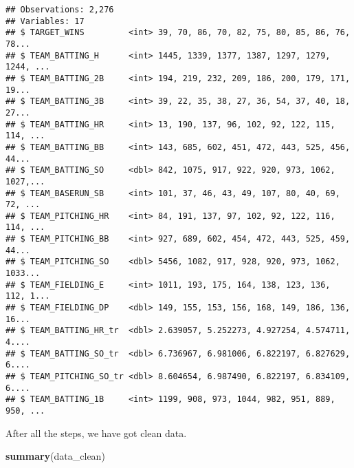 \documentclass[]{article}
\newenvironment{Shaded}{\begin{snugshade}}{\end{snugshade}}
\newcommand{\KeywordTok}[1]{\textcolor[rgb]{0.13,0.29,0.53}{\textbf{#1}}}
\newcommand{\NormalTok}[1]{#1}
\begin{document}
\begin{verbatim}
## Observations: 2,276
## Variables: 17
## $ TARGET_WINS         <int> 39, 70, 86, 70, 82, 75, 80, 85, 86, 76, 78...
## $ TEAM_BATTING_H      <int> 1445, 1339, 1377, 1387, 1297, 1279, 1244, ...
## $ TEAM_BATTING_2B     <int> 194, 219, 232, 209, 186, 200, 179, 171, 19...
## $ TEAM_BATTING_3B     <int> 39, 22, 35, 38, 27, 36, 54, 37, 40, 18, 27...
## $ TEAM_BATTING_HR     <int> 13, 190, 137, 96, 102, 92, 122, 115, 114, ...
## $ TEAM_BATTING_BB     <int> 143, 685, 602, 451, 472, 443, 525, 456, 44...
## $ TEAM_BATTING_SO     <dbl> 842, 1075, 917, 922, 920, 973, 1062, 1027,...
## $ TEAM_BASERUN_SB     <int> 101, 37, 46, 43, 49, 107, 80, 40, 69, 72, ...
## $ TEAM_PITCHING_HR    <int> 84, 191, 137, 97, 102, 92, 122, 116, 114, ...
## $ TEAM_PITCHING_BB    <int> 927, 689, 602, 454, 472, 443, 525, 459, 44...
## $ TEAM_PITCHING_SO    <dbl> 5456, 1082, 917, 928, 920, 973, 1062, 1033...
## $ TEAM_FIELDING_E     <int> 1011, 193, 175, 164, 138, 123, 136, 112, 1...
## $ TEAM_FIELDING_DP    <dbl> 149, 155, 153, 156, 168, 149, 186, 136, 16...
## $ TEAM_BATTING_HR_tr  <dbl> 2.639057, 5.252273, 4.927254, 4.574711, 4....
## $ TEAM_BATTING_SO_tr  <dbl> 6.736967, 6.981006, 6.822197, 6.827629, 6....
## $ TEAM_PITCHING_SO_tr <dbl> 8.604654, 6.987490, 6.822197, 6.834109, 6....
## $ TEAM_BATTING_1B     <int> 1199, 908, 973, 1044, 982, 951, 889, 950, ...
\end{verbatim}

After all the steps, we have got clean data.

\begin{Shaded}
\begin{Highlighting}[]
\KeywordTok{summary}\NormalTok{(data_clean)}
\end{Highlighting}
\end{Shaded}
\end{document}
